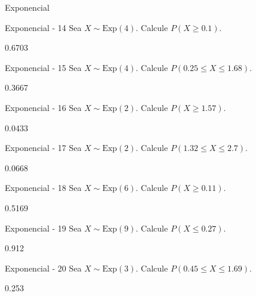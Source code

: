 \documentclass[a4,11pt]{aleph-notas}
\newcommand{\Exp}{\text{Exp}}
\begin{document}
\begin{quiz}{Exponencial}
\begin{numerical}[tolerance=0.001]%
    {Exponencial - 14}
    Sea \( X \sim \Exp(4) \). Calcule \( P(X \geq 0.1) \).
    \item[] 0.6703
\end{numerical}

\begin{numerical}[tolerance=0.001]%
    {Exponencial - 15}
    Sea \( X \sim \Exp(4) \). Calcule \( P(0.25 \leq X \leq 1.68) \).
    \item[] 0.3667
\end{numerical}

\begin{numerical}[tolerance=0.001]%
    {Exponencial - 16}
    Sea \( X \sim \Exp(2) \). Calcule \( P(X \geq 1.57) \).
    \item[] 0.0433
\end{numerical}

\begin{numerical}[tolerance=0.001]%
    {Exponencial - 17}
    Sea \( X \sim \Exp(2) \). Calcule \( P(1.32 \leq X \leq 2.7) \).
    \item[] 0.0668
\end{numerical}

\begin{numerical}[tolerance=0.001]%
    {Exponencial - 18}
    Sea \( X \sim \Exp(6) \). Calcule \( P(X \geq 0.11) \).
    \item[] 0.5169
\end{numerical}

\begin{numerical}[tolerance=0.001]%
    {Exponencial - 19}
    Sea \( X \sim \Exp(9) \). Calcule \( P(X \leq 0.27) \).
    \item[] 0.912
\end{numerical}

\begin{numerical}[tolerance=0.001]%
    {Exponencial - 20}
    Sea \( X \sim \Exp(3) \). Calcule \( P(0.45 \leq X \leq 1.69) \).
    \item[] 0.253
\end{numerical}


\end{quiz}
\end{document}

